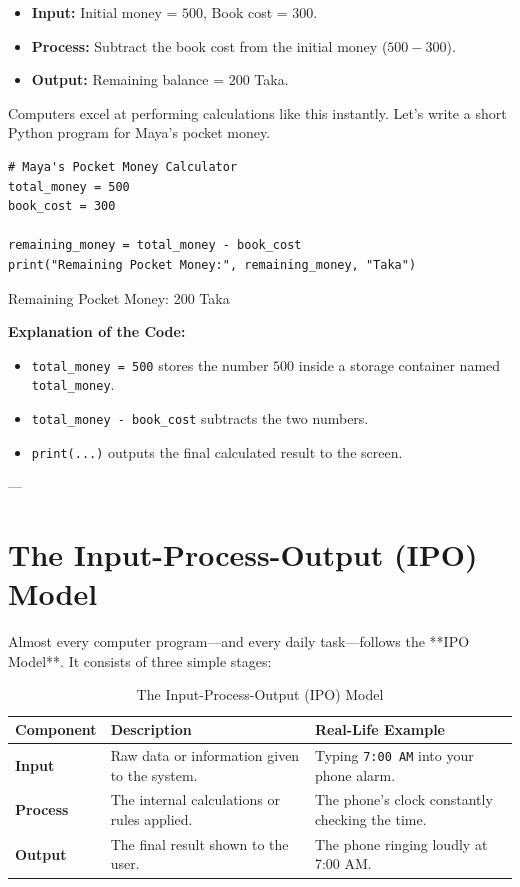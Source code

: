 \begin{itemize}
    \item \textbf{Input:} Initial money = $500$, Book cost = $300$.
    \item \textbf{Process:} Subtract the book cost from the initial money ($500 - 300$).
    \item \textbf{Output:} Remaining balance = $200$ Taka.
\end{itemize}

Computers excel at performing calculations like this instantly. Let's write a short Python program for Maya's pocket money.

\begin{lstlisting}
# Maya's Pocket Money Calculator
total_money = 500
book_cost = 300

remaining_money = total_money - book_cost
print("Remaining Pocket Money:", remaining_money, "Taka")
\end{lstlisting}

\begin{pythonoutput}
Remaining Pocket Money: 200 Taka
\end{pythonoutput}

\textbf{Explanation of the Code:}
\begin{itemize}
    \item \texttt{total\_money = 500} stores the number $500$ inside a storage container named \texttt{total\_money}.
    \item \texttt{total\_money - book\_cost} subtracts the two numbers.
    \item \texttt{print(...)} outputs the final calculated result to the screen.
\end{itemize}

---

\section{The Input-Process-Output (IPO) Model}

Almost every computer program—and every daily task—follows the **IPO Model**. It consists of three simple stages:

\begin{table}[h]
    \centering
    \renewcommand{\arraystretch}{1.5}
    \begin{tabular}{|p{3cm}|p{6cm}|p{5cm}|}
        \hline
        \textbf{Component} & \textbf{Description} & \textbf{Real-Life Example} \\
        \hline
        \textbf{Input} & Raw data or information given to the system. & Typing \texttt{7:00 AM} into your phone alarm. \\
        \hline
        \textbf{Process} & The internal calculations or rules applied. & The phone's clock constantly checking the time. \\
        \hline
        \textbf{Output} & The final result shown to the user. & The phone ringing loudly at 7:00 AM. \\
        \hline
    \end{tabular}
    \caption{The Input-Process-Output (IPO) Model}
    \label{tab:ipo}
\end{table}

